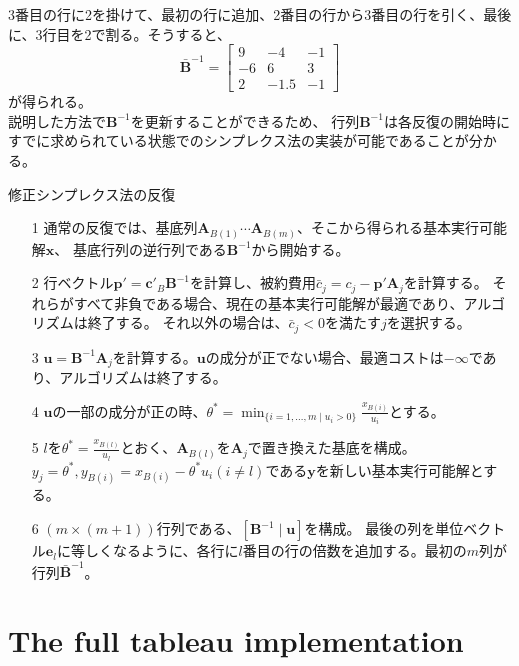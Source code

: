 \documentclass{jsarticle}
\begin{document}
3番目の行に2を掛けて、最初の行に追加、2番目の行から3番目の行を引く、最後に、3行目を2で割る。そうすると、
\begin{equation}
  \bar{\mathbf{B}}^{-1}=\left[\begin{array}{rrr}
  9 & -4 & -1 \\
  -6 & 6 & 3 \\
  2 & -1.5 & -1
  \end{array}\right]
  \end{equation}
が得られる。\\
説明した方法で$\bm{B}^{-1}$を更新することができるため、
行列$\bm{B}^{-1}$は各反復の開始時にすでに求められている状態でのシンプレクス法の実装が可能であることが分かる。
\begin{itembox}[l]{修正シンプレクス法の反復}
  \begin{itemize}
    \item[1] 通常の反復では、基底列$\bm{A}_{B(1)} \cdots \bm{A}_{B(m)}$、そこから得られる基本実行可能解$\bm{x}$、
    基底行列の逆行列である$\bm{B}^{-1}$から開始する。
    \item[2] 行ベクトル$\bm{p}'=\bm{c}'_B\bm{B}^{-1}$を計算し、被約費用$\bar{c}_j=c_j-\bm{p}'\bm{A}_j$を計算する。
    それらがすべて非負である場合、現在の基本実行可能解が最適であり、アルゴリズムは終了する。
    それ以外の場合は、$\bar{c}_j<0$を満たす$j$を選択する。
    \item[3] $\bm{u}=\bm{B}^{-1}\bm{A}_j$を計算する。$\bm{u}$の成分が正でない場合、最適コストは$-\infty$であり、アルゴリズムは終了する。
    \item[4]  $\bm{u}$の一部の成分が正の時、$\theta^{*}=\min_{\{i=1,\dots,m\mid u_i>0\}}{\frac{x_{B(i)}}{u_i}}$とする。
    \item[5]  $l$を$\theta^{*}=\frac{x_{B(l)}}{u_l}$とおく、$\bm{A}_{B(l)}$を$\bm{A}_{j}$で置き換えた基底を構成。
    $y_j=\theta^*,y_{B(i)}=x_{B(i)}-\theta^*u_i(i\neq l)$である$\bm{y}$を新しい基本実行可能解とする。
    \item[6] $(m\times (m+1))$行列である、$[\bm{B}^{-1}\mid \bm{u}]$を構成。
    最後の列を単位ベクトル$\bm{e}_l$に等しくなるように、各行に$l$番目の行の倍数を追加する。最初の$m$列が行列$\bar{\bm{B}}^{-1}$。
  \end{itemize}
\end{itembox}

\section*{The full tableau implementation}
\end{document}
